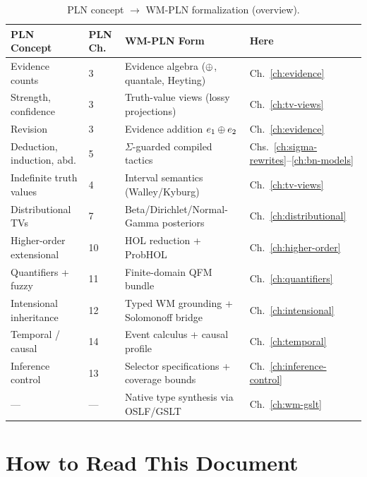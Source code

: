 \documentclass[11pt,openany]{report}
\begin{document}
\begin{table}[ht]
\centering
\caption{PLN concept $\to$ WM-PLN formalization (overview).}
\label{tab:concept-map}
\begin{tabular}{@{}llll@{}}
\toprule
\textbf{PLN Concept} & \textbf{PLN Ch.} & \textbf{WM-PLN Form} & \textbf{Here} \\
\midrule
Evidence counts           & 3  & Evidence algebra ($\oplus$, quantale, Heyting) & Ch.~\ref{ch:evidence} \\
Strength, confidence      & 3  & Truth-value views (lossy projections)           & Ch.~\ref{ch:tv-views} \\
Revision                  & 3  & Evidence addition $e_1 \oplus e_2$              & Ch.~\ref{ch:evidence} \\
Deduction, induction, abd.& 5  & $\Sigma$-guarded compiled tactics               & Chs.~\ref{ch:sigma-rewrites}--\ref{ch:bn-models} \\
Indefinite truth values   & 4  & Interval semantics (Walley/Kyburg)              & Ch.~\ref{ch:tv-views} \\
Distributional TVs        & 7  & Beta/Dirichlet/Normal-Gamma posteriors           & Ch.~\ref{ch:distributional} \\
Higher-order extensional  & 10 & HOL reduction + ProbHOL                         & Ch.~\ref{ch:higher-order} \\
Quantifiers + fuzzy       & 11 & Finite-domain QFM bundle                        & Ch.~\ref{ch:quantifiers} \\
Intensional inheritance   & 12 & Typed WM grounding + Solomonoff bridge           & Ch.~\ref{ch:intensional} \\
Temporal / causal         & 14 & Event calculus + causal profile                  & Ch.~\ref{ch:temporal} \\
Inference control         & 13 & Selector specifications + coverage bounds        & Ch.~\ref{ch:inference-control} \\
---                       & ---& Native type synthesis via OSLF/GSLT              & Ch.~\ref{ch:wm-gslt} \\
\bottomrule
\end{tabular}
\end{table}

\section{How to Read This Document}
\end{document}
